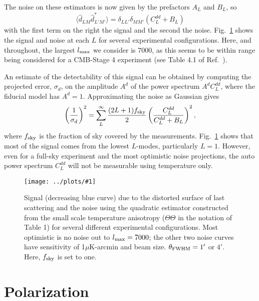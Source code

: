 \documentclass[prd,amsmath,amssymb,floatfix,superscriptaddress,nofootinbib,twocolumn]{revtex4-1}
\def\be{\begin{equation}}
\def\ee{\end{equation}}
\newcommand{\eql}[1]{\label{eq:#1}}
\newcommand{\sfig}[2]{
\texttt{[image: ../plots/\#1]}
        }
\newcommand{\Sfig}[2]{
   \begin{figure}[thbp]
   \begin{center}
    \sfig{#1.pdf}{\columnwidth}
    \caption{{\small #2}}
    \label{fig:#1}
     \end{center}
   \end{figure}
}
\newcommand{\rf}[1]{\ref{fig:#1}}
\begin{document}
The noise on these estimators is now given by the prefactors $A_L$ and $B_L$, so  
\be
\langle \hat d_{LM} \hat d^*_{L'M'}  \rangle = \delta_{LL'}\delta_{MM'} \left( C_L^{dd} + B_L \right)
\ee
with the first term on the right the signal and the second the noise. Fig.~\rf{Delay} shows the signal and noise at each $ L$ for several experimental configurations. Here, and throughout, the largest $l_{\rm max}$ we consider is 7000, as this seems to be within range being considered for a CMB-Stage 4 experiment (see Table 4.1 of Ref.~\cite{Abazajian:2016yjj}).

An estimate of the detectability of this signal can be obtained by computing the projected error, $\sigma_d$, on the amplitude $A^d$ of the power spectrum $A^dC_L^{dd}$, where the fiducial model has $A^d=1$.  Approximating the noise as Gaussian gives
\be
\left(\frac{1}{\sigma_d}\right)^2 = \sum_L^{\infty} \frac{(2L+1)f_{\rm sky}}{2} \left(\frac{C_L^{dd}}{C_L^{dd}+B_L}\right)^2,
\eql{sn}
\ee
where $f_{\rm sky}$ is the fraction of sky covered by the measurements.
Fig.~\rf{Delay} shows that most of the signal comes from the lowest $L$-modes, particularly $L=1$. However, even for a full-sky experiment and the most optimistic noise projections, the
auto power spectrum $C_L^{dd}$ will not be measurable using temperature only.



\Sfig{Delay}{Signal (decreasing blue curve) due to the distorted surface of last scattering and the noise using the quadratic estimator constructed from the small scale temperature anisotropy ($\Theta\Theta$ in the notation of Table 1) for several different experimental configurations. Most optimistic is no noise out to $l_{\rm max}=7000$; the other two noise curves have sensitivity of 1$\mu$K-arcmin and beam size. $\theta_{\rm FWHM}=1'$ or $4'$. Here, $f_{\rm sky}$ is set to one.} 




\section{Polarization}
\end{document}
